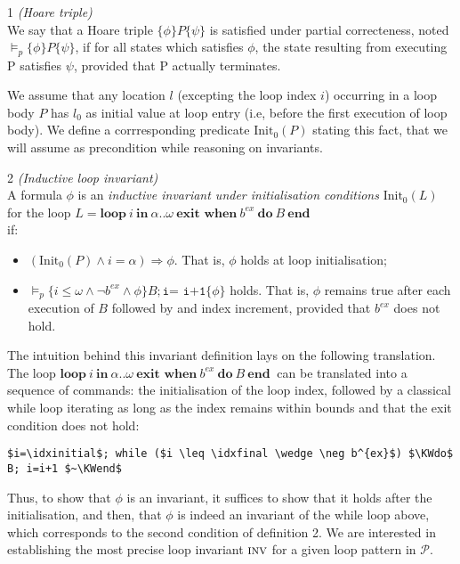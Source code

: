 \documentclass[a4paper,10pt]{article}
\newcommand{\prog}{\ensuremath{\mathcal{P}}\xspace}
\newcommand{\idx}{\ensuremath{i}\xspace}
\newcommand{\idxinitial}{\ensuremath{\alpha}\xspace}
\newcommand{\idxfinal}{\ensuremath{\omega}\xspace}
\newcommand{\Init}{\ensuremath{\mathrm{Init_{0}}}}
\newcommand{\KWloop}{\ensuremath{\mathrm{\textbf{loop}}~}}
\newcommand{\KWdo}{\ensuremath{\mathrm{\textbf{do}}~}}
\newcommand{\KWend}{\ensuremath{\mathrm{\textbf{end}}~}}
\newcommand{\KWin}{\ensuremath{~\mathrm{\textbf{in}}~}}
\newcommand{\KWexit}{\ensuremath{\mathrm{\textbf{exit when}}~}}
\newcommand{\inv}{\ensuremath{\textsc{inv}}\xspace}
\newenvironment{definition}[1][Definition]{\begin{trivlist}
\item[\hskip \labelsep {\bfseries #1}]}{\end{trivlist}}
\begin{document}
\begin{definition} 1 \emph{(Hoare triple)}\\
We say that a Hoare triple $\{\phi\} P \{ \psi \}$ is satisfied under partial correcteness, 
noted $\vDash_p \{\phi\} P \{ \psi \}$, if for all states which satisfies $\phi$, 
the state resulting from executing P satisfies $\psi$, provided that P actually terminates.
\end{definition}

We assume that any location $l$ (excepting the loop index \idx) occurring in  a loop body $P$ 
has $l_0$ as initial value at loop entry (i.e, before the first execution of loop body). 
We define a corrresponding predicate $\Init(P)$ stating this fact, 
that we will assume as precondition while reasoning on invariants.

\begin{definition} 2 \emph {(Inductive loop invariant)}\\
A formula $\phi$ is an \textit{inductive invariant under
initialisation conditions} $\Init(L)$ for the loop 
\hspace{1cm} $L = \KWloop  \idx \KWin \idxinitial ..\idxfinal ~ \KWexit b^{ex}~ \KWdo B ~\KWend$ \\
if: 
\begin{itemize}
\item $(\mathrm{Init}_0(P)  \wedge i=\idxinitial) \Rightarrow \phi$. 
      That is, $\phi$ holds at loop initialisation;
\item $\vDash_p \{i \leq \idxfinal \wedge \neg b^{ex} \wedge\phi \} B;
      \texttt{i= i+1} \{ \phi \}$ holds. That is, $\phi$ remains true after each 
      execution of $B$ followed by and index increment,  provided that $b^{ex}$ does not hold.
\end{itemize}
\end{definition}

The intuition behind this invariant definition lays on the following translation.
The loop $\KWloop  \idx \KWin \idxinitial ..\idxfinal ~ \KWexit b^{ex} ~ \KWdo B ~\KWend$ 
can be translated into a sequence of commands: the initialisation of the loop index, 
followed by a classical while loop iterating as long as the index remains within bounds
and that the exit condition does not hold:
{\small
\begin{lstlisting}[mathescape]
   $i=\idxinitial$; while ($i \leq \idxfinal \wedge \neg b^{ex}$) $\KWdo$ B; i=i+1 $~\KWend$
\end{lstlisting}
}
Thus, to show that $\phi$ is an invariant, it suffices to show that it holds after 
the initialisation, and then, that $\phi$ is indeed an invariant of the while loop above, 
which corresponds to the second condition of definition 2. We are interested in establishing 
the most precise loop invariant \inv for a given loop pattern in \prog.
\end{document}
